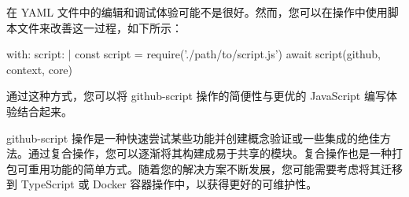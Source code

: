 
在 YAML 文件中的编辑和调试体验可能不是很好。然而，您可以在操作中使用脚本文件来改善这一过程，如下所示：

\begin{shell}
with:
  script: |
    const script = require('./path/to/script.js')
    await script({github, context, core})
\end{shell}

通过这种方式，您可以将 github-script 操作的简便性与更优的 JavaScript 编写体验结合起来。

github-script 操作是一种快速尝试某些功能并创建概念验证或一些集成的绝佳方法。通过复合操作，您可以逐渐将其构建成易于共享的模块。复合操作也是一种打包可重用功能的简单方式。随着您的解决方案不断发展，您可能需要考虑将其迁移到 TypeScript 或 Docker 容器操作中，以获得更好的可维护性。











